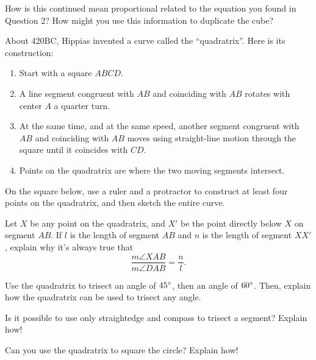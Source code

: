 \documentclass[handout]{ximera}
\begin{document}
\begin{question}
How is this continued mean proportional related to the equation you found in Question 2?  How might you use this information to duplicate the cube?
\end{question}

\newpage

About 420BC, Hippias invented a curve called the ``quadratrix''.  Here is its construction:
\begin{enumerate}
    \item Start with a square $ABCD$.
    \item A line segment congruent with $AB$ and coinciding with $AB$ rotates with center $A$ a quarter turn.
    \item At the same time, and at the same speed, another segment congruent with $AB$ and coinciding with $AB$ moves using straight-line motion through the square until it coincides with $CD$.
    \item Points on the quadratrix are where the two moving segments intersect.
\end{enumerate}



\begin{question}
On the square below, use a ruler and a protractor to construct at least four points on the quadratrix, and then sketch the entire curve.
\begin{image}
\end{image}
\end{question}

\begin{question}
Let $X$ be any point on the quadratrix, and $X'$ be the point directly below $X$ on segment $AB$.  If $l$ is the length of segment $AB$ and $n$ is the length of segment $XX'$, explain why it's always true that 
\[
\frac{m\angle XAB}{m\angle DAB} = \frac{n}{l}.
\]
\end{question}

\begin{question}
Use the quadratrix to trisect an angle of $45\degree$, then an angle of $60\degree$.  Then, explain how the quadratrix can be used to trisect any angle.
\end{question}

\begin{question}
Is it possible to use only straightedge and compass to trisect a segment?  Explain how!
\end{question}



\begin{question}
Can you use the quadratrix to square the circle?  Explain how!
\end{question}
\end{document}
